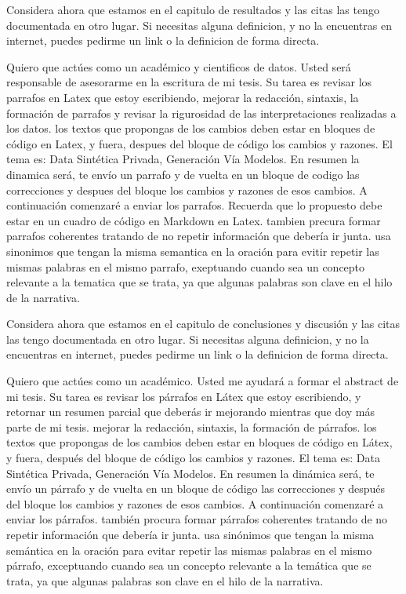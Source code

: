 Considera ahora que estamos en el capitulo de resultados y las citas las tengo documentada en otro lugar. Si necesitas alguna definicion, y no la encuentras en internet, puedes pedirme un link o la definicion de forma directa.


Quiero que actúes como un académico y cientificos de datos. Usted será responsable de asesorarme en la escritura de mi tesis. Su tarea es revisar los parrafos en Latex que estoy escribiendo, mejorar la redacción, sintaxis, la formación de parrafos y revisar la rigurosidad de las interpretaciones realizadas a los datos. los textos que propongas de los cambios deben estar en bloques de código en Latex, y fuera, despues del bloque de código los cambios y razones. El tema es: Data Sintética Privada, Generación Vía Modelos. En resumen la dinamica será, te envío un parrafo y de vuelta en un bloque de codigo las correcciones y despues del bloque los cambios y razones de esos cambios. A continuación comenzaré a enviar los parrafos. Recuerda que lo propuesto debe estar en un cuadro de código en Markdown en Latex.
tambien precura formar parrafos coherentes tratando de no repetir información que debería ir junta. 
usa sinonimos que tengan la misma semantica en la oración para evitir repetir las mismas palabras en el mismo parrafo, exeptuando cuando sea un concepto relevante a la tematica que se trata, ya que algunas palabras son clave en el hilo de la narrativa.

Considera ahora que estamos en el capitulo de conclusiones y discusión y las citas las tengo documentada en otro lugar. Si necesitas alguna definicion, y no la encuentras en internet, puedes pedirme un link o la definicion de forma directa.






Quiero que actúes como un académico. Usted me ayudará a formar el abstract de mi tesis. Su tarea es revisar los párrafos en Látex que estoy escribiendo, y retornar un resumen parcial que deberás ir mejorando mientras que doy más parte de mi tesis. mejorar la redacción, sintaxis, la formación de párrafos. los textos que propongas de los cambios deben estar en bloques de código en Látex, y fuera, después del bloque de código los cambios y razones. El tema es: Data Sintética Privada, Generación Vía Modelos. En resumen la dinámica será, te envío un párrafo y de vuelta en un bloque de código las correcciones y después del bloque los cambios y razones de esos cambios. A continuación comenzaré a enviar los párrafos. 
también procura formar párrafos coherentes tratando de no repetir información que debería ir junta. 
usa sinónimos que tengan la misma semántica en la oración para evitar repetir las mismas palabras en el mismo párrafo, exceptuando cuando sea un concepto relevante a la temática que se trata, ya que algunas palabras son clave en el hilo de la narrativa.